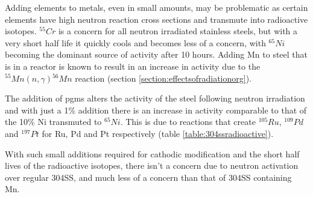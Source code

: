 Adding elements to metals, even in small amounts, may be problematic as certain elements have high neutron reaction cross sections and transmute into radioactive isotopes.  ${}^{55}Cr$ is a concern for all neutron irradiated stainless steels, but with a very short half life it quickly cools and becomes less of a concern, with ${}^{65}Ni$ becoming the dominant source of activity after 10 hours.  Adding Mn to steel that is in a reactor is known to result in an increase in activity due to the ${}^{55}Mn(n, \gamma){}^{56}Mn$ reaction (section \ref{section:effectsofradiationorg}).  

The addition of \acrshort{pgm}s alters the activity of the steel following neutron irradiation and with just a 1\% addition there is an increase in activity comparable to that of the 10\% Ni transmuted to ${}^{65}Ni$.  This is due to reactions that create ${}^{105}Ru$, 
 ${}^{109}Pd$ and ${}^{197}Pt$ for Ru, Pd and Pt respectively (table \ref{table:304ssradioactive}).  

With such small additions required for cathodic modification and the short half lives of the radioactive isotopes, there isn't a concern due to neutron activation over regular 304SS, and much less of a concern than that of 304SS containing Mn. 





